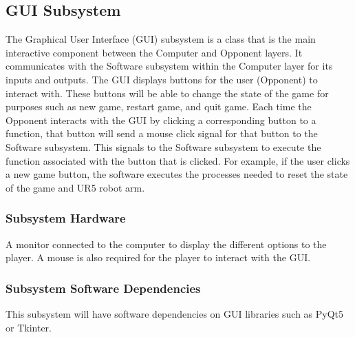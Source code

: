 \subsection{GUI Subsystem}
The Graphical User Interface (GUI) subsystem is a class that is the main interactive component between the Computer and Opponent layers. It communicates with the Software subsystem within the Computer layer for its inputs and outputs. The GUI displays buttons for the user (Opponent) to interact with. These buttons will be able to change the state of the game for purposes such as new game, restart game, and quit game. Each time the Opponent interacts with the GUI by clicking a corresponding button to a function, that button will send a mouse click signal for that button to the Software subsystem. This signals to the Software subsystem to execute the function associated with the button that is clicked. For example, if the user clicks a new game button, the software executes the processes needed to reset the state of the game and UR5 robot arm.


\subsubsection{Subsystem Hardware}
A monitor connected to the computer to display the different options to the player. A mouse is also required for the player to interact with the GUI.


\subsubsection{Subsystem Software Dependencies}
This subsystem will have software dependencies on GUI libraries such as PyQt5 or Tkinter.

